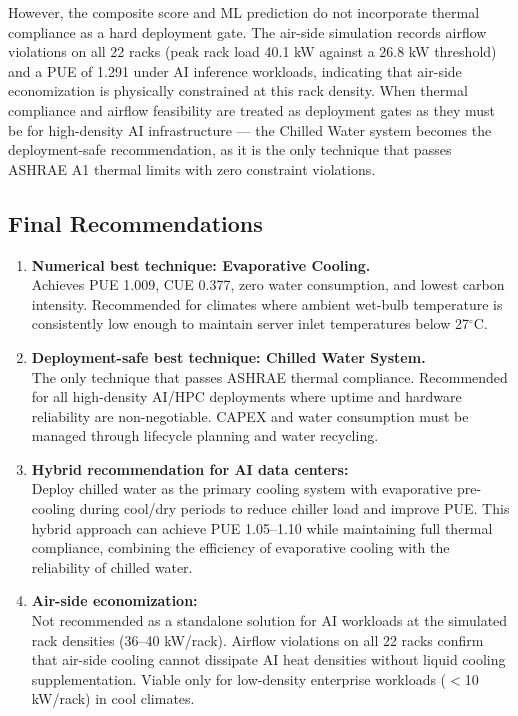 ﻿\documentclass[12pt,a4paper]{report}
\newcommand{\degC}{$^{\circ}$C}
\begin{document}
\noindent However, the composite score and ML prediction do not incorporate thermal
compliance as a hard deployment gate. The air-side simulation records airflow violations
on all 22 racks (peak rack load 40.1 kW against a 26.8 kW threshold) and a PUE of 1.291
under AI inference workloads, indicating that air-side economization is physically
constrained at this rack density. When thermal compliance and airflow feasibility are
treated as deployment gates as they must be for high-density AI infrastructure ---
the Chilled Water system becomes the deployment-safe recommendation, as it is the only
technique that passes ASHRAE A1 thermal limits with zero constraint violations.

\subsection{Final Recommendations}

\begin{enumerate}[leftmargin=*, label=\textbf{\arabic*.}, itemsep=6pt]
  \item \textbf{Numerical best technique: Evaporative Cooling.}\\
        Achieves PUE 1.009, CUE 0.377, zero water consumption, and lowest carbon intensity.
        Recommended for climates where ambient wet-bulb temperature is consistently low
        enough to maintain server inlet temperatures below 27\degC.

  \item \textbf{Deployment-safe best technique: Chilled Water System.}\\
        The only technique that passes ASHRAE thermal compliance. Recommended for all
        high-density AI/HPC deployments where uptime and hardware reliability are
        non-negotiable. CAPEX and water consumption must be managed through lifecycle
        planning and water recycling.

  \item \textbf{Hybrid recommendation for AI data centers:}\\
        Deploy chilled water as the primary cooling system with evaporative pre-cooling
        during cool/dry periods to reduce chiller load and improve PUE. This hybrid
        approach can achieve PUE 1.05--1.10 while maintaining full thermal compliance,
        combining the efficiency of evaporative cooling with the reliability of chilled water.

  \item \textbf{Air-side economization:}\\
        Not recommended as a standalone solution for AI workloads at the simulated rack
        densities (36--40 kW/rack). Airflow violations on all 22 racks confirm that
        air-side cooling cannot dissipate AI heat densities without liquid cooling
        supplementation. Viable only for low-density enterprise workloads ($<$10 kW/rack)
        in cool climates.
\end{enumerate}
\end{document}
